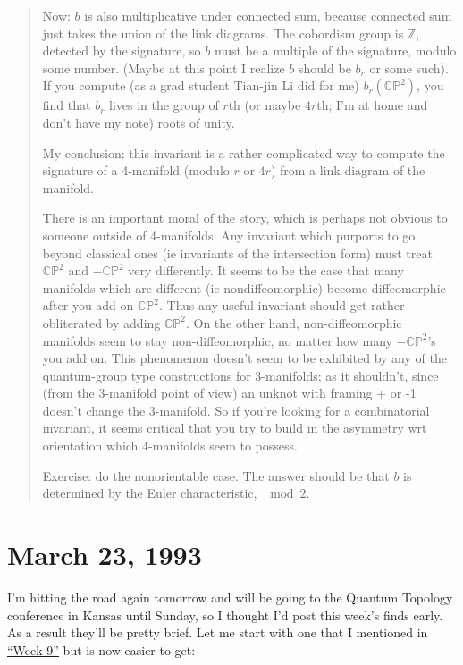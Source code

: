 \documentclass{article}
\begin{document}
\begin{quote}
Now: \(b\) is also multiplicative under connected sum, because connected
sum just takes the union of the link diagrams. The cobordism group is
\(\mathbb{Z}\), detected by the signature, so \(b\) must be a multiple
of the signature, modulo some number. (Maybe at this point I realize
\(b\) should be \(b_r\) or some such). If you compute (as a grad student
Tian-jin Li did for me) \(b_r(\mathbb{CP}^2)\), you find that \(b_r\)
lives in the group of \(r\)th (or maybe \(4r\)th; I'm at home and don't
have my note) roots of unity.

My conclusion: this invariant is a rather complicated way to compute the
signature of a 4-manifold (modulo \(r\) or \(4r\)) from a link diagram
of the manifold.

There is an important moral of the story, which is perhaps not obvious
to someone outside of 4-manifolds. Any invariant which purports to go
beyond classical ones (ie invariants of the intersection form) must
treat \(\mathbb{CP}^2\) and \(-\mathbb{CP}^2\) very differently. It
seems to be the case that many manifolds which are different (ie
nondiffeomorphic) become diffeomorphic after you add on
\(\mathbb{CP}^2\). Thus any useful invariant should get rather
obliterated by adding \(\mathbb{CP}^2\). On the other hand,
non-diffeomorphic manifolds seem to stay non-diffeomorphic, no matter
how many \(-\mathbb{CP}^2\)'s you add on. This phenomenon doesn't seem
to be exhibited by any of the quantum-group type constructions for
3-manifolds; as it shouldn't, since (from the 3-manifold point of view)
an unknot with framing + or -1 doesn't change the 3-manifold. So if
you're looking for a combinatorial invariant, it seems critical that you
try to build in the asymmetry wrt orientation which 4-manifolds seem to
possess.

Exercise: do the nonorientable case. The answer should be that \(b\) is
determined by the Euler characteristic, \(\mod 2\).
\end{quote}



\hypertarget{week11}{%
\section{March 23, 1993}\label{week11}}

I'm hitting the road again tomorrow and will be going to the Quantum
Topology conference in Kansas until Sunday, so I thought I'd post this
week's finds early. As a result they'll be pretty brief. Let me start
with one that I mentioned in \protect\hyperlink{week9}{``Week 9''} but
is now easier to get:
\end{document}
